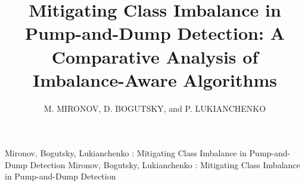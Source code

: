 \documentclass{ieeeaccess}
\begin{document}

\title{Mitigating Class Imbalance in Pump-and-Dump Detection: A Comparative Analysis of Imbalance-Aware Algorithms}
\author{\uppercase{M. Mironov},
\uppercase{D. Bogutsky}, and P. \uppercase{Lukianchenko}}

\address[1]{National Research University Higher School of Economics, Faculty of Computer Science, Laboratory of AI in Mathematical Finance (e-mail: mvmironov@hse.ru)}

\address[2]{National Research University Higher School of Economics, Faculty of Computer Science, Laboratory of AI in Mathematical Finance (e-mail: dbogucki@hse.ru)}

\address[3]{National Research University Higher School of Economics, Faculty of Computer Science, Laboratory of AI in Mathematical Finance (e-mail: plukyanchenko@hse.ru)}


\markboth
{Mironov, Bogutsky, Lukianchenko \headeretal: Mitigating Class Imbalance in Pump-and-Dump Detection}
{Mironov, Bogutsky, Lukianchenko \headeretal: Mitigating Class Imbalance in Pump-and-Dump Detection}

\end{document}
